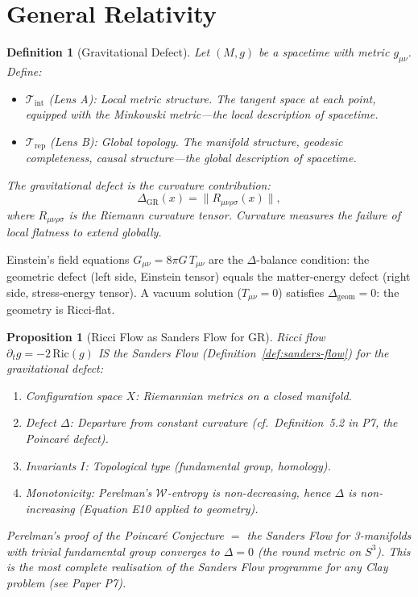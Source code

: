 \documentclass[12pt, openany]{book}
\newtheorem{proposition}[theorem]{Proposition}
\newtheorem{definition}[theorem]{Definition}
\theoremstyle{remark}
\newcommand{\Tint}{\mathcal{T}_{\mathrm{int}}}
\newcommand{\Trep}{\mathcal{T}_{\mathrm{rep}}}
\begin{document}
\section{General Relativity}
\label{sec:gr}

\begin{definition}[Gravitational Defect]
\label{def:gr-defect}
Let $(M, g)$ be a spacetime with metric $g_{\mu\nu}$.  Define:
\begin{itemize}
  \item $\Tint$ (Lens A): Local metric structure.  The tangent space at each
        point, equipped with the Minkowski metric---the local description
        of spacetime.
  \item $\Trep$ (Lens B): Global topology.  The manifold structure, geodesic
        completeness, causal structure---the global description of spacetime.
\end{itemize}
The gravitational defect is the curvature contribution:
\[
  \Delta_{\mathrm{GR}}(x) = \|R_{\mu\nu\rho\sigma}(x)\|,
\]
where $R_{\mu\nu\rho\sigma}$ is the Riemann curvature tensor.  Curvature
measures the failure of local flatness to extend globally.
\end{definition}

\noindent
Einstein's field equations $G_{\mu\nu} = 8\pi G\, T_{\mu\nu}$ are the
$\Delta$-balance condition: the geometric defect (left side, Einstein tensor)
equals the matter-energy defect (right side, stress-energy tensor).
A vacuum solution ($T_{\mu\nu} = 0$) satisfies $\Delta_{\mathrm{geom}} = 0$:
the geometry is Ricci-flat.

\begin{proposition}[Ricci Flow as Sanders Flow for GR]
\label{prop:ricci-sanders}
Ricci flow $\partial_t g = -2\,\mathrm{Ric}(g)$ IS the Sanders Flow
(Definition~\ref{def:sanders-flow}) for the gravitational defect:
\begin{enumerate}
  \item Configuration space $X$: Riemannian metrics on a closed manifold.
  \item Defect $\Delta$: Departure from constant curvature
        (cf.\ Definition~5.2 in P7, the Poincar\'e defect).
  \item Invariants $I$: Topological type (fundamental group, homology).
  \item Monotonicity: Perelman's $\mathcal{W}$-entropy is non-decreasing,
        hence $\Delta$ is non-increasing (Equation E10 applied to geometry).
\end{enumerate}
Perelman's proof of the Poincar\'e Conjecture $=$ the Sanders Flow for
3-manifolds with trivial fundamental group converges to $\Delta = 0$ (the
round metric on $S^3$).  This is the most complete realisation of the
Sanders Flow programme for any Clay problem (see Paper P7).
\end{proposition}
\end{document}
